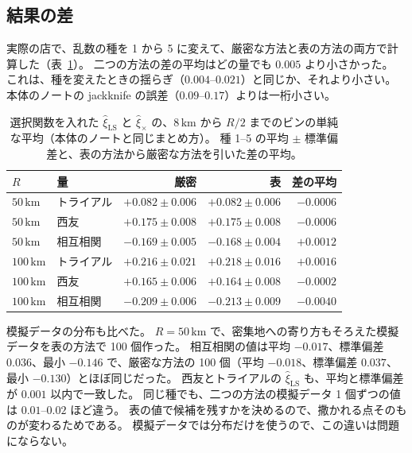 \documentclass[a4paper,11pt]{ltjsarticle}
\begin{document}
\subsection{結果の差}

実際の店で、乱数の種を 1 から 5 に変えて、厳密な方法と表の方法の両方で計算した（表~\ref{tab:tab-result}）。
二つの方法の差の平均はどの量でも $0.005$ より小さかった。
これは、種を変えたときの揺らぎ（$0.004$--$0.021$）と同じか、それより小さい。
本体のノートの jackknife の誤差（$0.09$--$0.17$）よりは一桁小さい。
\begin{table}[t]
  \centering
  \caption{選択関数を入れた $\hat\xi_{\mathrm{LS}}$ と $\hat\xi_{\times}$ の、$8\,\mathrm{km}$ から $R/2$ までのビンの単純な平均（本体のノートと同じまとめ方）。
    種 1--5 の平均 $\pm$ 標準偏差と、表の方法から厳密な方法を引いた差の平均。}
  \label{tab:tab-result}
  \small
  \begin{tabular}{llrrr}
    \toprule
    $R$ & 量 & 厳密 & 表 & 差の平均 \\
    \midrule
    $50\,\mathrm{km}$ & トライアル & $+0.082 \pm 0.006$ & $+0.082 \pm 0.006$ & $-0.0006$ \\
    $50\,\mathrm{km}$ & 西友 & $+0.175 \pm 0.008$ & $+0.175 \pm 0.008$ & $-0.0006$ \\
    $50\,\mathrm{km}$ & 相互相関 & $-0.169 \pm 0.005$ & $-0.168 \pm 0.004$ & $+0.0012$ \\
    $100\,\mathrm{km}$ & トライアル & $+0.216 \pm 0.021$ & $+0.218 \pm 0.016$ & $+0.0016$ \\
    $100\,\mathrm{km}$ & 西友 & $+0.165 \pm 0.006$ & $+0.164 \pm 0.008$ & $-0.0002$ \\
    $100\,\mathrm{km}$ & 相互相関 & $-0.209 \pm 0.006$ & $-0.213 \pm 0.009$ & $-0.0040$ \\
    \bottomrule
  \end{tabular}
\end{table}

模擬データの分布も比べた。
$R = 50\,\mathrm{km}$ で、密集地への寄り方もそろえた模擬データを表の方法で 100 個作った。
相互相関の値は平均 $-0.017$、標準偏差 $0.036$、最小 $-0.146$ で、厳密な方法の 100 個（平均 $-0.018$、標準偏差 $0.037$、最小 $-0.130$）とほぼ同じだった。
西友とトライアルの $\hat\xi_{\mathrm{LS}}$ も、平均と標準偏差が $0.001$ 以内で一致した。
同じ種でも、二つの方法の模擬データ 1 個ずつの値は $0.01$--$0.02$ ほど違う。
表の値で候補を残すかを決めるので、撒かれる点そのものが変わるためである。
模擬データでは分布だけを使うので、この違いは問題にならない。
\end{document}
